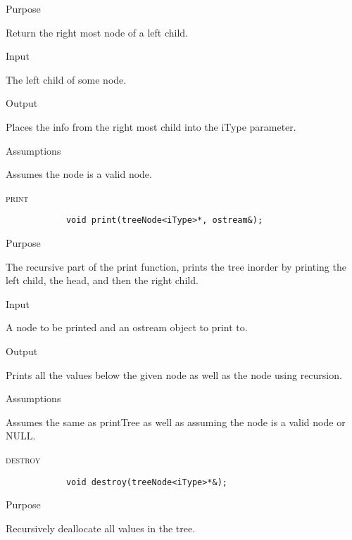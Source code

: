 \documentclass[pdftex, 12pt]{article}
\begin{document}
\begin{description}
\begin{description}
			\item{Purpose}

				Return the right most node of a left child.

			\item{Input}

				The left child of some node.

			\item{Output}

				Places the info from the right most child into the iType parameter.

			\item{Assumptions}

				Assumes the node is a valid node.

		\end{description}
	\item{\textsc{print}}
		\begin{lstlisting}
			void print(treeNode<iType>*, ostream&);
		\end{lstlisting}
		\begin{description}

			\item{Purpose}
				
				The recursive part of the print function, prints the tree inorder by printing the left child, the head,
				and then the right child.

			\item{Input}

				A node to be printed and an ostream object to print to.

			\item{Output}

				Prints all the values below the given node as well as the node using recursion.

			\item{Assumptions}
			
				Assumes the same as printTree as well as assuming the node is a valid node or NULL.

		\end{description}
	\item{\textsc{destroy}}
		\begin{lstlisting}
			void destroy(treeNode<iType>*&);
		\end{lstlisting}
		\begin{description}

			\item{Purpose}

				Recursively deallocate all values in the tree.


\end{description}
\end{description}
\end{document}
